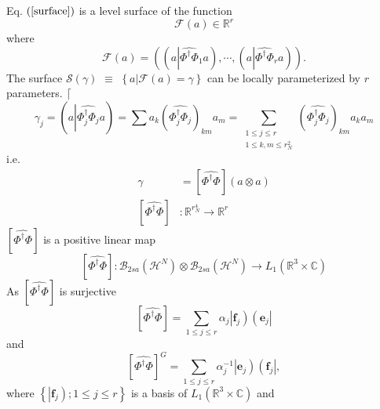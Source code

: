\documentclass[aps,preprint]{revtex4}%
\begin{document}
Eq. $\left(  \ref{surface}\right)  $ is a level surface of the function
\begin{equation}
\mathcal{F}\left(  a\right)  \in\mathbb{R}^{r}%
\end{equation}
where
\begin{equation}
\mathcal{F}\left(  a\right)  =\left(  \left(  a\left\vert \widehat
{\Phi^{\dagger}\Phi}_{1}\right.  a\right)  ,\cdots,\left(  a\left\vert
\widehat{\Phi^{\dagger}\Phi}_{r}\right.  a\right)  \right)  .
\end{equation}
The surface $\mathcal{S}\left(  \gamma\right)  $ $\equiv$ $\left\{  \left.
a\right\vert \mathcal{F}\left(  a\right)  =\gamma\right\}  $ can be locally
parameterized by $r$ parameters. $\lceil$%
\begin{equation}
\gamma_{j}=\left(  a\left\vert \widehat{\Phi_{j}^{\dagger}\Phi_{j}}\right.
a\right)  =\sum a_{k}\left(  \widehat{\Phi_{j}^{\dagger}\Phi_{j}}\right)
_{km}a_{m}=\sum_{\substack{1\leq j\leq r\\1\leq k,m\leq r_{N}^{2}}}\left(
\widehat{\Phi_{j}^{\dagger}\Phi_{j}}\right)  _{km}a_{k}a_{m}%
\end{equation}
i.e.
\begin{align}
\gamma &  =\left[  \widehat{\Phi^{\dagger}\Phi}\right]  \left(  a\otimes
a\right) \\
\left[  \widehat{\Phi^{\dagger}\Phi}\right]   &  :\mathbb{R}^{r_{N}^{4}%
}\rightarrow\mathbb{R}^{r}%
\end{align}
$\left[  \widehat{\Phi^{\dagger}\Phi}\right]  $ is a positive linear map
\begin{equation}
\left[  \widehat{\Phi^{\dagger}\Phi}\right]  :\mathcal{B}_{2sa}\left(
\mathcal{H}^{N}\right)  \otimes\mathcal{B}_{2sa}\left(  \mathcal{H}%
^{N}\right)  \rightarrow L_{1}\left(  \mathbb{R}^{3}\times\mathbb{C}\right)
\end{equation}
As $\left[  \widehat{\Phi^{\dagger}\Phi}\right]  $ is surjective
\begin{equation}
\left[  \widehat{\Phi^{\dagger}\Phi}\right]  =\sum_{1\leq j\leq r}\alpha
_{j}\left\vert \mathbf{f}_{j}\right)  \left(  \mathbf{e}_{j}\right\vert
\end{equation}
and
\begin{equation}
\left[  \widehat{\Phi^{\dagger}\Phi}\right]  ^{G}=\sum_{1\leq j\leq r}%
\alpha_{j}^{-1}\left\vert \mathbf{e}_{j}\right)  \left(  \mathbf{f}%
_{j}\right\vert ,
\end{equation}
where $\left\{  \left\vert \mathbf{f}_{j}\right)  ;1\leq j\leq r\right\}  $ is
a basis of $L_{1}\left(  \mathbb{R}^{3}\times\mathbb{C}\right)  $ and
\end{document}
